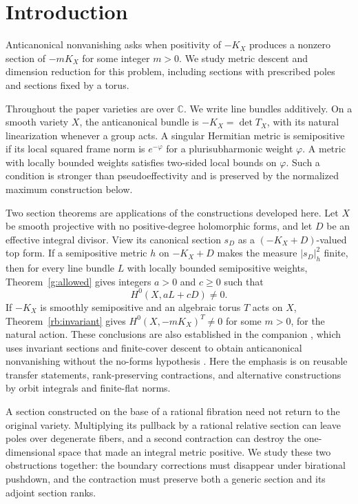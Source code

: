 \section{Introduction}\label{g:introduction}

Anticanonical nonvanishing asks when positivity of $-K_X$ produces a
nonzero section of $-mK_X$ for some integer $m>0$. We study metric
descent and dimension reduction for this problem, including sections
with prescribed poles and sections fixed by a torus.

Throughout the paper varieties are over $\mathbb C$. We write line
bundles additively. On a smooth variety $X$, the anticanonical bundle is
$-K_X=\det T_X$, with its natural linearization whenever a group acts.
A singular Hermitian metric is semipositive if its local squared frame
norm is $e^{-\varphi}$ for a plurisubharmonic weight $\varphi$.
A metric with locally bounded weights satisfies two-sided local bounds
on $\varphi$. Such a condition is stronger than pseudoeffectivity and
is preserved by the normalized maximum construction below.

Two section theorems are applications of the constructions developed
here. Let $X$ be smooth projective with no positive-degree holomorphic
forms, and let $D$ be an effective integral divisor. View its canonical
section $s_D$ as a $(-K_X+D)$-valued top form. If a semipositive metric
$h$ on $-K_X+D$ makes the measure $|s_D|_h^2$ finite, then for every
line bundle $L$ with locally bounded semipositive weights,
Theorem~\ref{g:allowed} gives integers $a>0$ and $c\ge0$ such that
\[
 H^0(X,aL+cD)\ne0.
\]
If $-K_X$ is smoothly semipositive and an algebraic torus $T$ acts on
$X$, Theorem~\ref{rb:invariant} gives
$H^0(X,-mK_X)^T\ne0$ for some $m>0$, for the natural action.
These conclusions are also established in the companion
\cite[Theorems~1.2 and~8.1]{HFiniteVolume}, which uses invariant sections
and finite-cover descent to obtain anticanonical nonvanishing without
the no-forms hypothesis \cite[Theorem~1.1]{HFiniteVolume}.
Here the emphasis is on reusable transfer statements, rank-preserving
contractions, and alternative constructions by orbit integrals and
finite-flat norms.

A section constructed on the base of a rational fibration need not
return to the original variety. Multiplying its pullback by a rational
relative section can leave poles over degenerate fibers, and a second
contraction can destroy the one-dimensional space that made an
integral metric positive. We study these two obstructions together:
the boundary corrections must disappear under birational pushdown,
and the contraction must preserve both a generic section and its
adjoint section ranks.

